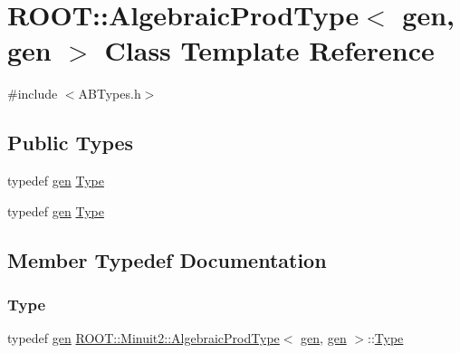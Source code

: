 \hypertarget{classROOT_1_1Minuit2_1_1AlgebraicProdType_3_01gen_00_01gen_01_4}{}\section{R\+O\+OT\+:\+:Algebraic\+Prod\+Type$<$ gen, gen $>$ Class Template Reference}
\label{classROOT_1_1Minuit2_1_1AlgebraicProdType_3_01gen_00_01gen_01_4}


{\ttfamily \#include $<$A\+B\+Types.\+h$>$}

\subsection*{Public Types}
\begin{DoxyCompactItemize}
\item 
typedef \mbox{\hyperlink{classROOT_1_1Minuit2_1_1gen}{gen}} \mbox{\hyperlink{classROOT_1_1Minuit2_1_1AlgebraicProdType_3_01gen_00_01gen_01_4_a423aa1dfc05f189aa1a3809d355a5efe}{Type}}
\item 
typedef \mbox{\hyperlink{classROOT_1_1Minuit2_1_1gen}{gen}} \mbox{\hyperlink{classROOT_1_1Minuit2_1_1AlgebraicProdType_3_01gen_00_01gen_01_4_a423aa1dfc05f189aa1a3809d355a5efe}{Type}}
\end{DoxyCompactItemize}


\subsection{Member Typedef Documentation}
\mbox{\label{classROOT_1_1Minuit2_1_1AlgebraicProdType_3_01gen_00_01gen_01_4_a423aa1dfc05f189aa1a3809d355a5efe}} 
\subsubsection{\texorpdfstring{Type}{Type}\hspace{0.1cm}{\footnotesize\ttfamily [1/2]}}
{\footnotesize\ttfamily typedef \mbox{\hyperlink{classROOT_1_1Minuit2_1_1gen}{gen}} \mbox{\hyperlink{classROOT_1_1Minuit2_1_1AlgebraicProdType}{R\+O\+O\+T\+::\+Minuit2\+::\+Algebraic\+Prod\+Type}}$<$ \mbox{\hyperlink{classROOT_1_1Minuit2_1_1gen}{gen}}, \mbox{\hyperlink{classROOT_1_1Minuit2_1_1gen}{gen}} $>$\+::\mbox{\hyperlink{classROOT_1_1Minuit2_1_1AlgebraicProdType_3_01gen_00_01gen_01_4_a423aa1dfc05f189aa1a3809d355a5efe}{Type}}}

